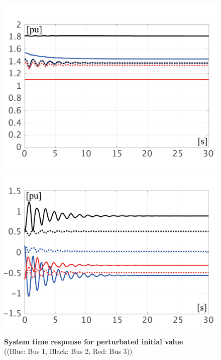 \documentclass[graybox, envcountchap]{svmult}
\begin{document}
\begin{figure}[t]
{\begin{minipage}{0.49\linewidth}
    \medskip
  \end{minipage}
 \begin{minipage}{0.49\linewidth}
    \centering
    \includegraphics[width = 1.0\linewidth]{figs/EabsV0}
    \medskip
  \end{minipage}
  \begin{minipage}{0.49\linewidth}
    \centering
    \includegraphics[width = 1.0\linewidth]{figs/PQ0}
    \medskip
  \end{minipage}
  }
  \medskip
  \caption{\textbf{System time response for perturbated initial value}
  \\  \centering((Blue: Bus 1, Black: Bus 2, Red: Bus 3))}
  \label{fig:Kron0}
\medskip
\end{figure}
\end{document}
